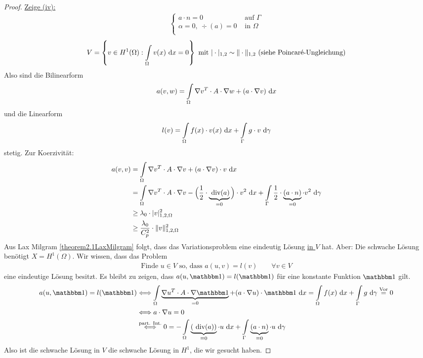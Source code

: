\begin{proof}
\underline{Zeige (iv):}
\begin{align*}
	\left\{\begin{array}{rl}
a\cdot n=0&\text{ auf }\Gamma\\
\alpha=0,~\div(a)=0&\text{ in  }\Omega\\
\end{array}\right. 
\end{align*}
\begin{align*}
	V=\left\lbrace v\in H^1(\Omega):\int\limits_\Omega v(x)\text{ d} x=0\right\rbrace\text{ mit }|\cdot|_{1,2}\sim\Vert\cdot\Vert_{1,2}\text{ (siehe Poincaré-Ungleichung)}
\end{align*}
Also sind die Bilinearform
\begin{align*}
a(v,w)=\int\limits_\Omega\nabla v^T\cdot A\cdot\nabla w+(a\cdot\nabla v)\text{ d} x
\end{align*}
und die Linearform 
\begin{align*}
l(v)=\int\limits_\Omega f(x)\cdot v(x)\text{ d} x+\int\limits_\Gamma g\cdot v\text{ d}\gamma
\end{align*}
stetig. Zur Koerzivität:
\begin{align*}
a(v,v)&=\int\limits_\Omega\nabla v^T\cdot A\cdot\nabla v+(a\cdot\nabla v)\cdot v\text{ d} x\\
&=\int\limits_\Omega\nabla v^T\cdot A\cdot \nabla v-\Big(\frac{1}{2}\cdot\underbrace{\text{ div}(a)}_{=0}\Big)\cdot v^2\text{ d} x+\int\limits_\Gamma\frac{1}{2}\cdot\underbrace{(a\cdot n)}_{=0}\cdot v^2\text{ d}\gamma\\
&\geq\lambda_0\cdot|v|_{1,2,\Omega}^2\\
&\geq\frac{\lambda_0}{C^2_p}\cdot\Vert v\Vert^2_{1,2,\Omega}
\end{align*}
Aus Lax Milgram \ref{theorem2.1LaxMilgram} folgt, dass das Variationsproblem eine eindeutig Lösung \ul{in $V$} hat. Aber: Die schwache Lösung benötigt $X=H^1(\Omega)$. Wir wissen, dass das Problem
\begin{align*}
\text{Finde $u\in V$ so, dass }a(u,v)=l(v)\qquad\forall v\in V
\end{align*}
eine eindeutige Lösung besitzt. Es bleibt zu zeigen, dass $a(u,\indi)=l(\indi)$ für eine konstante Funktion $\indi$ gilt.
\begin{align*}
a(u,\indi)=l(\indi)
&\Longleftrightarrow
\int\limits_\Omega\underbrace{\nabla u^T\cdot A\cdot\nabla\indi}_{=0}+(a\cdot\nabla u)\cdot\indi\d x
=
\int\limits_\Omega f(x)\d x+\int\limits_\Gamma g\d\gamma\stackeq{\text{Vor}}0\\
&\Longleftrightarrow
a\cdot \nabla u=0\\
&\stackrel{\text{part. Int.}}{\Longleftrightarrow}
0=-\int\limits_\Omega\underbrace{(\div(a))}_{\equiv0}\cdot u\d x+\int\limits_\Gamma\underbrace{(a\cdot n)}_{\equiv 0}\cdot u\d\gamma
\end{align*}
Also ist die schwache Lösung in $V$ die schwache Lösung in $H^1$, die wir gesucht haben.
\end{proof}

